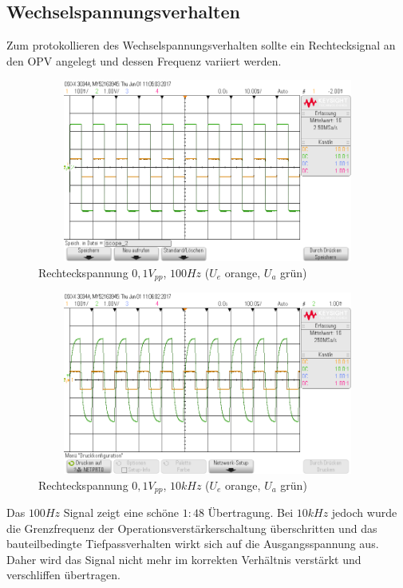 \newpage
\subsection{Wechselspannungsverhalten}

Zum protokollieren des Wechselspannungsverhalten sollte ein Rechtecksignal an den OPV angelegt und dessen Frequenz variiert
werden.\\

\begin{figure}[H]
 \begin{center}
  \includegraphics[height=6cm,width=12cm]{OsziBilder/nichtInvVer_100Hz}
 \end{center}
 \caption{Rechteckspannung $0,1V_{pp}$, $100Hz$ ($U_e$ orange, $U_a$ grün)}
\end{figure}

\begin{figure}[H]
 \begin{center}
  \includegraphics[height=6cm,width=12cm]{OsziBilder/nichtInvVer_10kHz}
 \end{center}
 \caption{Rechteckspannung $0,1V_{pp}$, $10kHz$ ($U_e$ orange, $U_a$ grün)}
\end{figure}
\noindent
Das $100Hz$ Signal zeigt eine schöne $1:48$ Übertragung. Bei $10kHz$ jedoch
wurde die Grenzfrequenz der Operationsverstärkerschaltung überschritten und das bauteilbedingte Tiefpassverhalten wirkt sich
auf die Ausgangsspannung aus. Daher wird das Signal nicht mehr im korrekten Verhältnis verstärkt und verschliffen übertragen.\\
